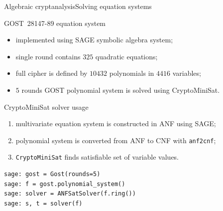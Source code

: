 \documentclass[10pt, ucs]{beamer}
\begin{document}
\begin{frame}[fragile, shrink=2]{Algebraic cryptanalysis}{Solving equation systems}
    \begin{block}{GOST~28147-89 equation system}
        \begin{itemize}
            \item implemented using SAGE symbolic algebra system;
            \item single round contains $325$ quadratic equations;
            \item full cipher is defined by $10432$ polynomials in $4416$ variables;
            \item $5$ rounds GOST polynomial system is solved using CryptoMiniSat.
        \end{itemize}
    \end{block}

    \begin{block}{CryptoMiniSat solver usage}
    \begin{enumerate}
        \item multivariate equation system is constructed in ANF using SAGE;
        \item polynomial system is converted from ANF to CNF with \verb+anf2cnf+;
        \item \verb+CryptoMiniSat+ finds satisfiable set of variable values.
    \end{enumerate} 
    \end{block}
    \begin{example}
\begin{lstlisting}
sage: gost = Gost(rounds=5)
sage: f = gost.polynomial_system()
sage: solver = ANFSatSolver(f.ring())
sage: s, t = solver(f)
\end{lstlisting}
    \end{example}
\end{frame}
\end{document}
